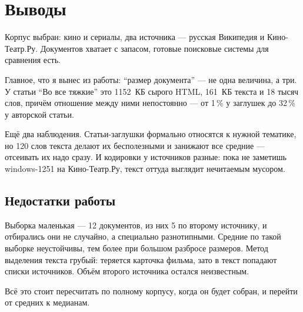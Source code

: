 \section{Выводы}

Корпус выбран: кино и сериалы, два источника --- русская Википедия и Кино-Театр.Ру.
Документов хватает с запасом, готовые поисковые системы для сравнения есть.

Главное, что я вынес из работы: \enquote{размер документа} --- не одна величина, а три.
У статьи \enquote{Во все тяжкие} это 1152~КБ сырого HTML, 161~КБ текста и 18 тысяч слов,
причём отношение между ними непостоянно --- от 1\,\% у заглушек до 32\,\% у авторской
статьи.

Ещё два наблюдения. Статьи-заглушки формально относятся к нужной тематике, но 120 слов
текста делают их бесполезными и занижают все средние --- отсеивать их надо сразу. И
кодировки у источников разные: пока не заметишь windows-1251 на Кино-Театр.Ру, текст
оттуда выглядит нечитаемым мусором.

\subsection*{Недостатки работы}

Выборка маленькая --- 12 документов, из них 5 по второму источнику, и отбирались они не
случайно, а специально разнотипными. Средние по такой выборке неустойчивы, тем более
при большом разбросе размеров. Метод выделения текста грубый: теряется карточка фильма,
зато в текст попадают списки источников. Объём второго источника остался неизвестным.

Всё это стоит пересчитать по полному корпусу, когда он будет собран, и перейти от
средних к медианам.

\pagebreak
